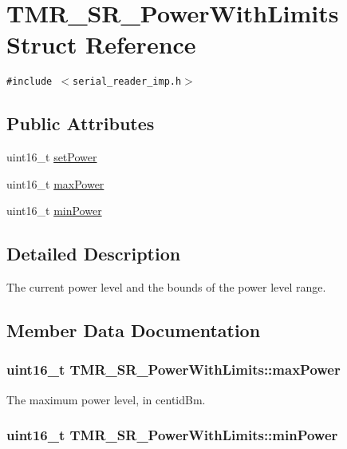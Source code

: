 \hypertarget{struct_t_m_r___s_r___power_with_limits}{
\section{TMR\_\-SR\_\-PowerWithLimits Struct Reference}
\label{struct_t_m_r___s_r___power_with_limits}
}
{\tt \#include $<$serial\_\-reader\_\-imp.h$>$}

\subsection*{Public Attributes}
\begin{CompactItemize}
\item 
uint16\_\-t \hyperlink{struct_t_m_r___s_r___power_with_limits_2495562c63738830918fd751e3f07234}{setPower}
\item 
uint16\_\-t \hyperlink{struct_t_m_r___s_r___power_with_limits_9c568c45bc6f40f5ac83d12fa98de427}{maxPower}
\item 
uint16\_\-t \hyperlink{struct_t_m_r___s_r___power_with_limits_4f6bbdfdffddf1d2d4ebea679fd67c24}{minPower}
\end{CompactItemize}


\subsection{Detailed Description}
The current power level and the bounds of the power level range. 

\subsection{Member Data Documentation}
\hypertarget{struct_t_m_r___s_r___power_with_limits_9c568c45bc6f40f5ac83d12fa98de427}{
\subsubsection[{maxPower}]{\setlength{\rightskip}{0pt plus 5cm}uint16\_\-t {\bf TMR\_\-SR\_\-PowerWithLimits::maxPower}}}
\label{struct_t_m_r___s_r___power_with_limits_9c568c45bc6f40f5ac83d12fa98de427}


The maximum power level, in centidBm. \hypertarget{struct_t_m_r___s_r___power_with_limits_4f6bbdfdffddf1d2d4ebea679fd67c24}{
\subsubsection[{minPower}]{\setlength{\rightskip}{0pt plus 5cm}uint16\_\-t {\bf TMR\_\-SR\_\-PowerWithLimits::minPower}}}
\label{struct_t_m_r___s_r___power_with_limits_4f6bbdfdffddf1d2d4ebea679fd67c24}



